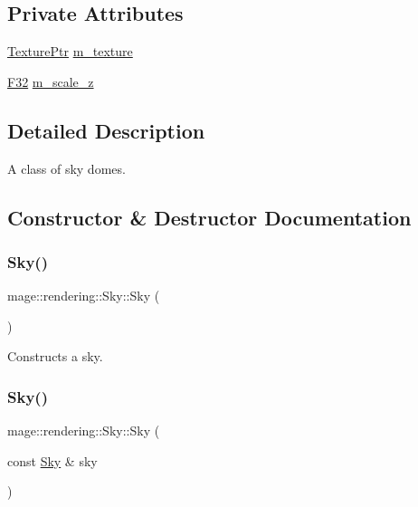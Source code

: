 \subsection*{Private Attributes}
\begin{DoxyCompactItemize}
\item 
\mbox{\hyperlink{namespacemage_1_1rendering_a6f3ae54f825328465b0cdde0f0de4a36}{Texture\+Ptr}} \mbox{\hyperlink{classmage_1_1rendering_1_1_sky_a674493833d7c13a329ba35429a1d9dfa}{m\+\_\+texture}}
\item 
\mbox{\hyperlink{namespacemage_aa97e833b45f06d60a0a9c4fc22ae02c0}{F32}} \mbox{\hyperlink{classmage_1_1rendering_1_1_sky_a45ba48d9ce09ff566f9edb930d759dba}{m\+\_\+scale\+\_\+z}}
\end{DoxyCompactItemize}


\subsection{Detailed Description}
A class of sky domes. 

\subsection{Constructor \& Destructor Documentation}
\mbox{\label{classmage_1_1rendering_1_1_sky_a9679ec331c5e0fc01c49760f6e74664d}} 
\subsubsection{\texorpdfstring{Sky()}{Sky()}\hspace{0.1cm}{\footnotesize\ttfamily [1/3]}}
{\footnotesize\ttfamily mage\+::rendering\+::\+Sky\+::\+Sky (\begin{DoxyParamCaption}{ }\end{DoxyParamCaption})}

Constructs a sky. \mbox{\label{classmage_1_1rendering_1_1_sky_aeafa720fff92be3f02d484a47443b973}} 
\subsubsection{\texorpdfstring{Sky()}{Sky()}\hspace{0.1cm}{\footnotesize\ttfamily [2/3]}}
{\footnotesize\ttfamily mage\+::rendering\+::\+Sky\+::\+Sky (\begin{DoxyParamCaption}\item[{const \mbox{\hyperlink{classmage_1_1rendering_1_1_sky}{Sky}} \&}]{sky }\end{DoxyParamCaption})\hspace{0.3cm}{\ttfamily [default]}}


